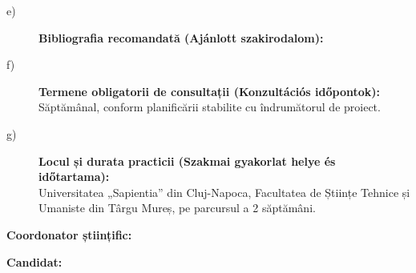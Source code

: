\begin{description}
  \item[\normalfont e)] {\bfseries Bibliografia recomandată (Ajánlott szakirodalom):}
    
  \item[\normalfont f)] {\bfseries Termene obligatorii de consultații (Konzultációs időpontok):}\\
    Săptămânal, conform planificării stabilite cu îndrumătorul de proiect.
    
  \item[\normalfont g)] {\bfseries Locul și durata practicii (Szakmai gyakorlat helye és időtartama):}\\
    Universitatea „Sapientia” din Cluj-Napoca, Facultatea de Științe Tehnice și Umaniste din Târgu Mureș, pe parcursul a 2 săptămâni.
\end{description}

\vspace{1.5cm}

\noindent
\begin{minipage}[t]{0.48\textwidth}
  \raggedright
  {\bfseries Coordonator științific:}\\
  \vspace{1.2cm}
  \makebox[5cm]{\dotfill}
\end{minipage}\hfill
\begin{minipage}[t]{0.48\textwidth}
  \raggedright
  {\bfseries Candidat:}\\
  \vspace{1.2cm}
  \makebox[5cm]{\dotfill}
\end{minipage}

\clearpage
